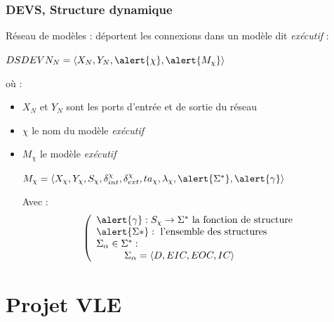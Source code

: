 \documentclass[xetex, compress, table, svgnames]{beamer}
\begin{document}
\begin{frame}
  \frametitle{DEVS, Structure dynamique}
  \begin{exampleblock}{}
    Réseau de modèles : déportent les connexions dans un modèle dit
    \emph{exécutif} :
    \begin{center}
      $DSDEVN_N = \langle X_N, Y_N, \alert{\chi}, \alert{M_{\chi}}
      \rangle$
    \end{center}
  \end{exampleblock}
  \begin{exampleblock}{}
    où :\\
    \begin{itemize}
    \item $X_N$ et $Y_N$ sont les ports d'entrée et de sortie du réseau
    \item $\chi$ le nom du modèle \emph{exécutif}
    \item $M_\chi$ le modèle \emph{exécutif}\\
      \begin{center}
        $M_\chi = \langle X_\chi, Y_\chi, S_\chi, \delta_{int}^\chi,
        \delta_{ext}^\chi, ta_{\chi}, \lambda_{\chi}, \alert{\Sigma^*},
        \alert{\gamma}\rangle$
      \end{center}
      Avec :
      $$\left(
        \begin{array}{l}
          \alert{\gamma} : S_\chi \rightarrow \Sigma^*\text{ la fonction de
            structure}\\
          \alert{\Sigma*} : \text{ l'ensemble des structures}\\
          \Sigma_\alpha \in \Sigma^* :\\
          \hspace{1cm}\Sigma_\alpha = \langle D, EIC, EOC, IC \rangle
        \end{array}
      \right.$$
    \end{itemize}
  \end{exampleblock}
\end{frame}

\section{Projet VLE}
\end{document}
